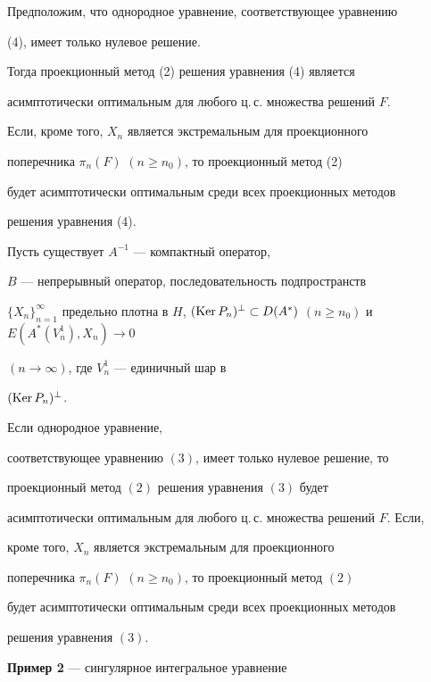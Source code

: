 Предположим, что однородное уравнение, соответствующее уравнению


(4), имеет только нулевое решение.


Тогда проекционный метод (2) решения уравнения (4) является


асимптотически оптимальным для любого ц.\,с. множества решений $F$.





Если, кроме того, $X_n$ является экстремальным для проекционного


поперечника $\pi _n(F)$ $(n\geq n_0)$, то проекционный метод (2)


будет асимптотически оптимальным среди всех проекционных методов


решения уравнения (4).





\begin{thm}


Пусть существует $A^{-1}$ --- компактный оператор,


$B$ --- непрерывный оператор, последовательность подпространств


$\{ X_n\} _{n=1}^{\infty}$ предельно плотна в $H$, $(\Ker P_n)^\bot


\subset D(A^*)$ $(n \geq n_0)$ и $E(A^*(V_n^1),X_n) \rightarrow 0$


$(n \rightarrow \infty )$, где $V_n^1$ --- единичный шар в


$(\operatorname{Ker} P_n)^\bot$.


Если однородное уравнение,


соответствующее уравнению $(3)$, имеет только нулевое решение, то


проекционный метод $(2)$ решения уравнения $(3)$ будет


асимптотически оптимальным для любого ц.\,с. множества решений $F$. Если,


кроме того, $X_n$ является экстремальным для проекционного


поперечника $\pi _n(F)$ $(n\geq n_0)$, то проекционный метод $(2)$


будет асимптотически оптимальным среди всех проекционных методов


решения уравнения $(3)$.


\end{thm}





{\bf Пример 2} --- сингулярное интегральное уравнение


